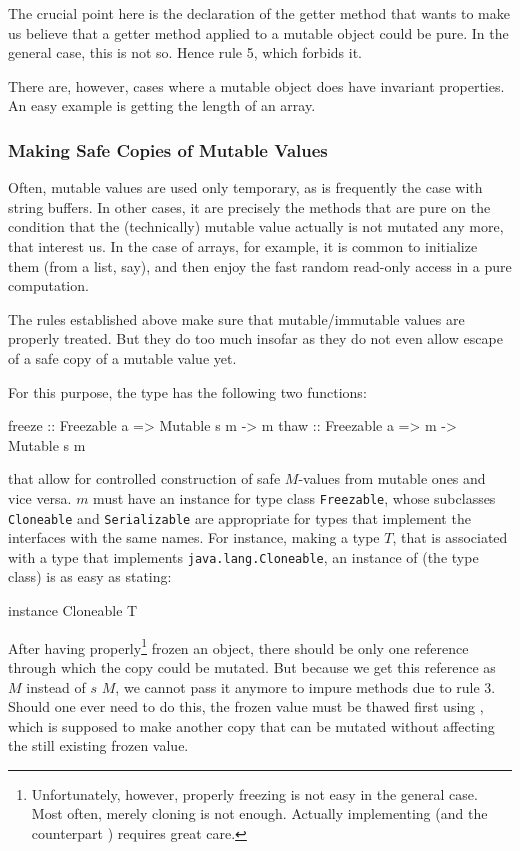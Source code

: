 The crucial point here is the declaration of the getter method that wants to make us believe that a getter method applied to a mutable object could be pure. In the general case, this is not so. Hence rule 5, which forbids it.

There are, however, cases where a mutable object does have invariant properties. An easy example is getting the length of an array.

\subsubsection{Making Safe Copies of Mutable Values}

Often, mutable values are used only temporary, as is frequently the case with string buffers. 
In other cases, it are precisely the methods that are pure on the condition that the (technically) mutable value actually is not mutated any more, that interest us.
In the case of arrays, for example, it is common to initialize them (from a list, say), and then enjoy the fast random read-only access in a pure computation.

The rules established above make sure that mutable/immutable values are properly treated. But they do too much insofar as they do not even allow escape of a safe copy of a mutable value yet.

For this purpose, the  type has the following two functions:

\begin{code}
freeze :: Freezable a => Mutable s m -> m
thaw   :: Freezable a => m -> Mutable s m
\end{code}

that allow for controlled construction of safe $M$-values from mutable ones and vice versa. $m$ must have an instance for type class \texttt{Freezable}, whose subclasses \texttt{Cloneable} and \texttt{Serializable} are appropriate for \java{} types that implement the \java{} interfaces with the same names. For instance, making a type $T$, that is associated with a \java{} type that implements \texttt{java.lang.Cloneable}, an instance of  (the type class)  is as easy as stating:

\begin{code}
instance Cloneable T
\end{code}

After having properly\footnote{
Unfortunately, however, properly freezing is not easy in the general case. Most often, merely cloning is not enough. Actually implementing  (and the counterpart ) requires great care.}
frozen an object, there should be only one reference through which the copy could be mutated. But because we get this reference as $M$ instead of  $s$ $M$, we cannot pass it anymore to impure methods due to rule 3. Should one ever need to do this, the frozen value must be thawed first using , which is supposed to make another copy that can be mutated without affecting the still existing frozen value.

